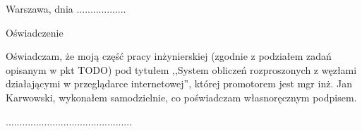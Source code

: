 \documentclass[a4paper,11pt,twoside]{report}
\theoremstyle{definition}
\newcommand{\tytul}{System obliczeń rozproszonych z węzłami działającymi w przeglądarce internetowej}
\renewcommand{\title}{A system for distributed computing with web browser--based nodes}
\newcommand{\type}{inżyniers} %
\newcommand{\supervisor}{mgr inż. Jan Karwowski}
\begin{document}
\null\thispagestyle{empty}\newpage

{
\begin{abstract}

\begin{center}
\title
\end{center}

Lorem ipsum dolor sit amet, consetetur sadipscing elitr, sed diam nonumyeirmod tempor invidunt ut labore et dolore magna aliquyam erat, sed diamvoluptua. At vero eos et accusam et justo duo dolores et ea rebum. Stet clita kasd gubergren, no sea takimata sanctus est Lorem ipsum dolor sit amet.

Lorem ipsum dolor sit amet, consetetur sadipscing elitr, sed diam nonumyeirmod tempor invidunt ut labore et dolore magna aliquyam erat, sed diamvoluptua. At vero eos et accusam et justo duo dolores et ea rebum. Stet clita kasd gubergren, no sea takimata sanctus est Lorem ipsum dolor sit amet.\\

\noindent \textbf{Keywords:} keyword1, keyword2, ...
\end{abstract}
}




\null\thispagestyle{empty}\newpage

\null \hfill Warszawa, dnia ..................\\

\par\vspace{5cm}

\begin{center}
Oświadczenie
\end{center}

\indent Oświadczam, że moją część pracy \type kiej (zgodnie z podziałem zadań opisanym w pkt TODO) pod
tytułem ,,\tytul '', której promotorem jest \supervisor , wykonałem
samodzielnie, co poświadczam własnoręcznym podpisem.
\vspace{2cm}


\begin{flushright}
  \begin{minipage}{50mm}
    \begin{center}
      ..............................................

    \end{center}
  \end{minipage}
\end{flushright}
\end{document}
